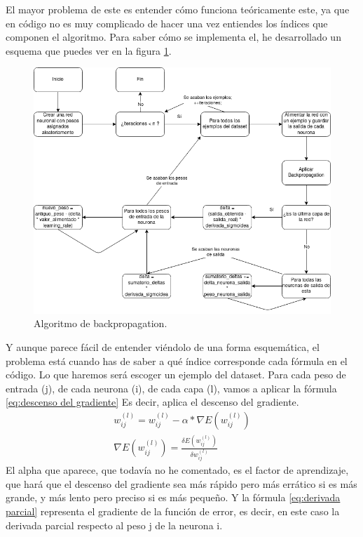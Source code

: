 El mayor problema de este es entender cómo funciona teóricamente este, ya que en código no es muy complicado de hacer una vez entiendes los índices que componen el algoritmo. Para saber cómo se implementa el, he desarrollado un esquema que puedes ver en la figura \ref{Algoritmo de backpropagation}.
\begin{figure}[h]
	\centering
	\includegraphics[width=15cm]{archivos/imagenes/Algoritmo-de-backpropagation.png}
	\caption{Algoritmo de backpropagation.}
	\label{Algoritmo de backpropagation}
\end{figure}

Y aunque parece fácil de entender viéndolo de una forma esquemática, el problema está cuando has de saber a qué índice corresponde cada fórmula en el código. Lo que haremos será escoger un ejemplo del dataset. Para cada peso de entrada (j), de cada neurona (i), de cada capa (l), vamos a aplicar la fórmula \ref{eq:descenso del gradiente} Es decir, aplica el descenso del gradiente.
\begin{subequations}
	\begin{eqnarray}
		w_{ij}^{(l)} = w_{ij}^{(l)} - \alpha*\nabla E(w_{ij}^{(l)}) \label{eq:descenso del gradiente} \\
		\nabla E(w_{ij}^{(l)}) =  \frac{\delta E(w_{ij}^{(l)})}{\delta w_{ij}^{(l)}} \label{eq:derivada parcial}
	\end{eqnarray}
\end{subequations}
El alpha que aparece, que todavía no he comentado, es el factor de aprendizaje, que hará que el descenso del gradiente sea más rápido pero más errático si es más grande, y más lento pero preciso si es más pequeño. Y la fórmula \ref{eq:derivada parcial} representa el gradiente de la función de error, es decir, en este caso la derivada parcial respecto al peso j de la neurona i.

